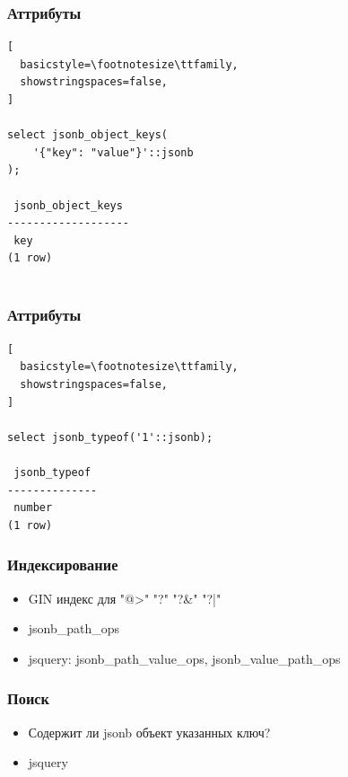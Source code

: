 \documentclass[14pt, compress, aspectratio=169]{beamer}
\begin{document}
\begin{frame}[fragile]
  \frametitle{Аттрибуты}

\begin{lstlisting}[
  basicstyle=\footnotesize\ttfamily,
  showstringspaces=false,
]

select jsonb_object_keys(
    '{"key": "value"}'::jsonb
);

 jsonb_object_keys 
-------------------
 key
(1 row)
         
\end{lstlisting}

\end{frame}

\begin{frame}[fragile]
  \frametitle{Аттрибуты}

\begin{lstlisting}[
  basicstyle=\footnotesize\ttfamily,
  showstringspaces=false,
]

select jsonb_typeof('1'::jsonb);

 jsonb_typeof 
--------------
 number
(1 row)

\end{lstlisting}

\end{frame}

\begin{frame}[fragile]
  \frametitle{Индексирование}

  \begin{itemize}[label={\MVRightarrow}]
    \item GIN индекс для "@>" "?" "?\&" "?|"
    \item jsonb\_path\_ops
    \item jsquery: jsonb\_path\_value\_ops, jsonb\_value\_path\_ops
  \end{itemize}

\end{frame}

\begin{frame}[fragile]
  \frametitle{Поиск}

  \begin{itemize}[label={\MVRightarrow}]
    \item Содержит ли jsonb объект указанных ключ?
    \item jsquery
  \end{itemize}

\end{frame}
\end{document}
